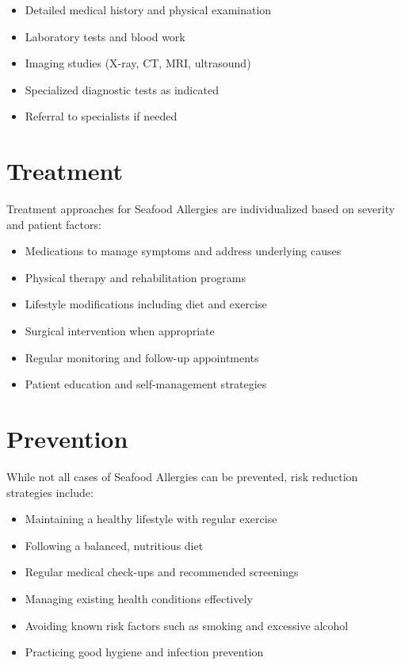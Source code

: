 \begin{itemize}
\item Detailed medical history and physical examination
\item Laboratory tests and blood work
\item Imaging studies (X-ray, CT, MRI, ultrasound)
\item Specialized diagnostic tests as indicated
\item Referral to specialists if needed
\end{itemize}

\section*{Treatment}
Treatment approaches for Seafood Allergies are individualized based on severity and patient factors:

\begin{itemize}
\item Medications to manage symptoms and address underlying causes
\item Physical therapy and rehabilitation programs
\item Lifestyle modifications including diet and exercise
\item Surgical intervention when appropriate
\item Regular monitoring and follow-up appointments
\item Patient education and self-management strategies
\end{itemize}

\section*{Prevention}
While not all cases of Seafood Allergies can be prevented, risk reduction strategies include:

\begin{itemize}
\item Maintaining a healthy lifestyle with regular exercise
\item Following a balanced, nutritious diet
\item Regular medical check-ups and recommended screenings
\item Managing existing health conditions effectively
\item Avoiding known risk factors such as smoking and excessive alcohol
\item Practicing good hygiene and infection prevention
\end{itemize}

